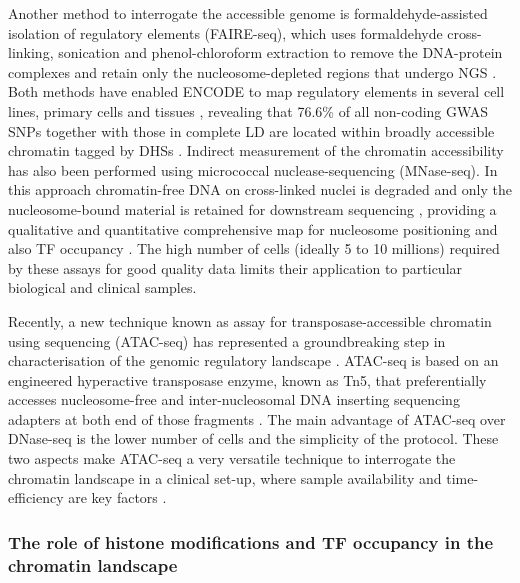 Another method to interrogate the accessible genome is formaldehyde-assisted isolation of regulatory elements (FAIRE-seq), which uses formaldehyde cross-linking, sonication and phenol-chloroform extraction to remove the DNA-protein complexes and retain only the nucleosome-depleted regions that undergo NGS \parencite{Giresi2006}. Both methods have enabled ENCODE to map regulatory elements in several cell lines, primary cells and tissues , revealing that 76.6\% of all non-coding GWAS SNPs together with those in complete LD are located within broadly accessible chromatin tagged by DHSs \parencite{ENCODE2007,Buck2014,Gaulton2010, Maurano2012}. 
Indirect measurement of the chromatin accessibility has also been performed using micrococcal nuclease-sequencing (MNase-seq). In this approach chromatin-free DNA on cross-linked nuclei is degraded and only the nucleosome-bound material is retained for downstream sequencing , providing a qualitative and quantitative comprehensive map for nucleosome positioning and also TF occupancy \parencite{Axel1975,Ponts2010}. The high number of cells (ideally 5 to 10 millions) required by these assays for good quality data limits their application to particular biological and clinical samples. 

Recently, a new technique known as assay for transposase-accessible chromatin using sequencing (ATAC-seq) has represented a groundbreaking step in characterisation of the genomic regulatory landscape \parencite{Buenrostro2013}. ATAC-seq is based on an engineered hyperactive transposase enzyme, known as Tn5, that preferentially accesses nucleosome-free and inter-nucleosomal DNA inserting sequencing adapters at both end of those fragments \parencite{Gradman2008, Adey2010}. The main advantage of ATAC-seq over DNase-seq is the lower number of cells and the simplicity of the protocol. These two aspects make ATAC-seq a very versatile technique to interrogate the chromatin landscape in a clinical set-up, where sample availability and time-efficiency are key factors \parencite{Scharer2016,Qu2015,Qu2017}. 


\subsubsection{The role of histone modifications and TF occupancy in the chromatin landscape}

